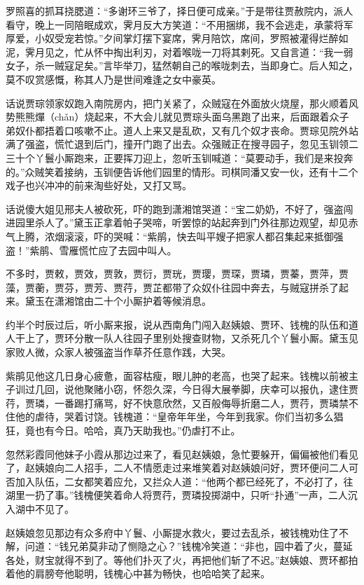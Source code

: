 \documentclass[12pt,oneside]{book}
\begin{document}
罗照喜的抓耳挠腮道：“多谢环三爷了，择日便可成亲。”于是带往贾赦院内，派人看守，晚上一同陪眠成欢，霁月反大方笑道：“不用捆绑，我不会逃走，承蒙将军厚爱，小奴受宠若惊。”夕间掌灯摆下宴席，霁月陪饮，席间，罗照被灌得烂醉如泥，霁月见之，忙从怀中掏出利刃，对着喉咙一刀将其剌死。又自言道：“我一弱女子，杀一贼寇足矣。”言毕举刀，猛然朝自己的喉咙刺去，当即身亡。后人知之，莫不叹赏感慨，称其人乃是世间难逢之女中豪英。

话说贾琮领家奴跑入南院房内，把门关紧了，众贼寇在外面放火烧屋，那火顺着风势熊熊燀（chǎn）烧起来，不大会儿就见贾琮头面乌黑跑了出来，后面跟着众子弟奴仆都捂着口咳嗽不止。道人上来又是乱砍，又有几个奴才丧命。贾琮见院外站满了强盗，慌忙退到后门，撞开门跑了出去。众强贼正在搜寻园子，忽见玉钏领二三十个丫鬟小厮跑来，正要挥刀迎上，忽听玉钏喊道：“莫要动手，我们是来投奔的。”众贼笑着接纳，玉钏便告诉他们园里的情形。司棋同潘又安一伙，还有十二个戏子也兴冲冲的前来淘些好处，又打又骂。

话说傻大姐见邢夫人被砍死，吓的跑到潇湘馆哭道：“宝二奶奶，不好了，强盗闯进园里杀人了。”黛玉正拿着帕子哭啼，听罢惊的站起奔到门外往那边观望，却见赤气上腾，浓烟滚滚，吓的哭喊：“紫鹃，快去叫平嫂子把家人都召集起来抵御强盗！”紫鹃、雪雁慌忙应了去园中叫人。

不多时，贾敕，贾效，贾敦，贾衍，贾珖，贾璎，贾琛，贾璘，贾蓁，贾萍，贾藻，贾蘅，贾芬，贾芳、贾荇，贾芷都带了众奴仆往园中奔去，与贼寇拼杀了起来。黛玉在潇湘馆由二十个小厮护着等候消息。

约半个时辰过后，听小厮来报，说从西南角门闯入赵姨娘、贾环、钱槐的队伍和道人干上了，贾环分散一队人往园子里别处搜查财物，又杀死几个丫鬟小厮。黛玉见家败人微，众家人被强盗当作草芥任意作践，大哭。

紫鹃见他这几日身心疲惫，面容枯瘦，眼儿肿的老高，也哭了起来。钱槐以前被主子训过几回，说他聚赌小窃，怀怨久深，今日得大展拳脚，庆幸可以报仇，逮住贾荇，贾璘，一番踢打痛骂，好不快意欣然，又百般侮辱折磨二人，贾荇，贾璘禁不住他的虐待，哭着讨饶。钱槐道：“皇帝年年坐，今年到我家。你们当初多么猖狂，竟也有今日。哈哈，真乃天助我也。”仍虐打不止。

忽然彩霞同他妹子小霞从那边过来了，看见赵姨娘，急忙要躲开，偏偏被他们看见了，赵姨娘向二人招手，二人不情愿走过来堆笑着对赵姨娘问好，贾环便问二人可否加入队伍，二女都笑着应允，又拦众人道：“他两个都已经死了，不必打了，往湖里一扔了事。”钱槐便笑着命人将贾荇，贾璘投掷湖中，只听“扑通”一声，二人沉入湖中不见了。

赵姨娘忽见那边有众多府中丫鬟、小厮提水救火，要过去乱杀，被钱槐劝住了不解，问道：“钱兄弟莫非动了恻隐之心？”钱槐冷笑道：“非也，园中着了火，蔓延各处，财宝就得不到了。等他们扑灭了火，再把他们斩了不迟。”赵姨娘、贾环都拍着他的肩膀夸他聪明，钱槐心中甚为畅快，也哈哈笑了起来。
\end{document}
